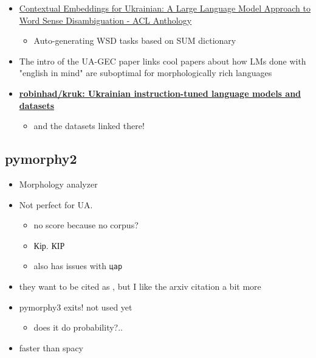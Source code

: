 \begin{itemize}
\tightlist
\item
  \href{https://aclanthology.org/2023.unlp-1.2/}{Contextual Embeddings
  for Ukrainian: A Large Language Model Approach to Word Sense
  Disambiguation - ACL Anthology}

  \begin{itemize}
  \tightlist
  \item
    Auto-generating WSD tasks based on SUM dictionary
  \end{itemize}
\item
  The intro of the UA-GEC paper \cite{Syvokon2022} links cool papers
  about how LMs done with "english in mind" are suboptimal for
  morphologically rich languages
\item
  \textbf{\href{https://github.com/robinhad/kruk}{robinhad/kruk:
  Ukrainian instruction-tuned language models and datasets}}

  \begin{itemize}
  \tightlist
  \item
    and the datasets linked there!
  \end{itemize}
\end{itemize}

\subsection{pymorphy2}\label{pymorphy2}

\begin{itemize}
\tightlist
\item
  Morphology analyzer
\item
  Not perfect for UA.

  \begin{itemize}
  \tightlist
  \item
    no score because no corpus? \cite{Korobov2015}
  \item
    Кір. КІР
  \item
    also has issues with \texttt{цар}
  \end{itemize}
\item
  they want to be cited as \cite{Korobov}, but I like the arxiv
  citation a bit more \cite{Korobov2015}
\item
  pymorphy3 exits! not used yet

  \begin{itemize}
  \tightlist
  \item
    does it do probability?..
  \end{itemize}
\item
  faster than spacy
\end{itemize}


